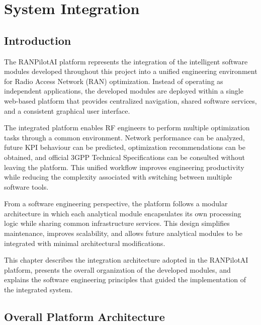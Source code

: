 \chapter{System Integration}
\label{chap:integration}

\section{Introduction}

The RANPilotAI platform represents the integration of the intelligent software modules developed throughout this project into a unified engineering environment for Radio Access Network (RAN) optimization. Instead of operating as independent applications, the developed modules are deployed within a single web-based platform that provides centralized navigation, shared software services, and a consistent graphical user interface.

The integrated platform enables RF engineers to perform multiple optimization tasks through a common environment. Network performance can be analyzed, future KPI behaviour can be predicted, optimization recommendations can be obtained, and official 3GPP Technical Specifications can be consulted without leaving the platform. This unified workflow improves engineering productivity while reducing the complexity associated with switching between multiple software tools.

From a software engineering perspective, the platform follows a modular architecture in which each analytical module encapsulates its own processing logic while sharing common infrastructure services. This design simplifies maintenance, improves scalability, and allows future analytical modules to be integrated with minimal architectural modifications.

This chapter describes the integration architecture adopted in the RANPilotAI platform, presents the overall organization of the developed modules, and explains the software engineering principles that guided the implementation of the integrated system.

\section{Overall Platform Architecture}

